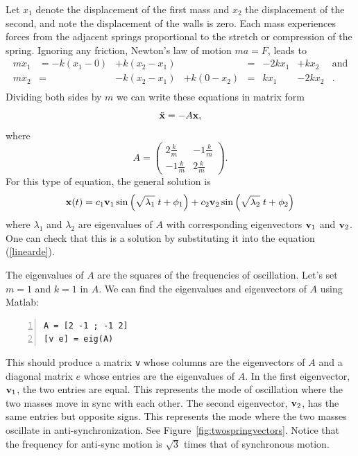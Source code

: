Let $x_1$ denote the displacement of the first mass and $x_2$ the displacement
of the second, and note the displacement of the walls is zero. Each
mass experiences forces from the adjacent springs proportional to the
stretch or compression of the spring.
Ignoring any friction, Newton's law of motion $ma = F$, leads to
\begin{equation}
\begin{array}{rlcclrrl}
m \ddot{x}_1 &= -k(x_1-0)&+k(x_2-x_1)&	       &=& -2k x_1 &+ k x_2 &\text{and}\\
m \ddot{x}_2 &=		 &-k(x_2-x_1)&+k(0-x_2) &=& k x_1 &- 2 k x_2&.\\
\end{array}
\end{equation}
Dividing both sides by $m$ we can write these equations in matrix form
\begin{equation} \label{linearde}
\ddot{\mathbf{x}} = - A \mathbf{x},
\end{equation}
where
\begin{equation}
A   = \left(\begin{array}{cc} 2 \frac{k}{m} & -1 \frac{k}{m} \\
                                                        -1 \frac{k}{m} & 2  \frac{k}{m}
                                       \end{array} \right).
\end{equation}
For this type of equation, the general solution is
\begin{equation}
\mathbf{x}(t)
= c_1 \mathbf{v}_1 \sin\left(\sqrt{\lambda_1}\; t + \phi_1\right)
+ c_2 \mathbf{v}_2 \sin\left(\sqrt{\lambda_2}\; t + \phi_2\right)
\end{equation}
where $\lambda_1$ and $\lambda_2$ are eigenvalues of $A$ with corresponding eigenvectors
$\mathbf{v}_1$ and $\mathbf{v}_2$. One can check that this is a solution by substituting it into
the equation (\ref{linearde}).

The eigenvalues of $A$ are the squares of the
frequencies of oscillation. Let's set $m =1$ and $k=1$ in $A$.
We can find the eigenvalues and eigenvectors of $A$ using Matlab:
\begin{lstlisting}[frame=none,numbers=left]
A = [2 -1 ; -1 2]
[v e] = eig(A)
\end{lstlisting}
This should produce a matrix \verb&v& whose columns are the eigenvectors of $A$
and a diagonal matrix $e$ whose entries are the eigenvalues of $A$.
In the first eigenvector, $\mathbf{v}_1$, the two entries are equal. This represents
the mode of oscillation where the two masses move in sync with each other.
The second eigenvector, $\mathbf{v}_2$, has the same entries but opposite signs. This represents
the mode where the two masses oscillate in anti-synchronization.
See Figure~\ref{fig:twospringvectors}.
Notice that the frequency for anti-sync motion is $\sqrt{3}$ times that of
synchronous motion.

